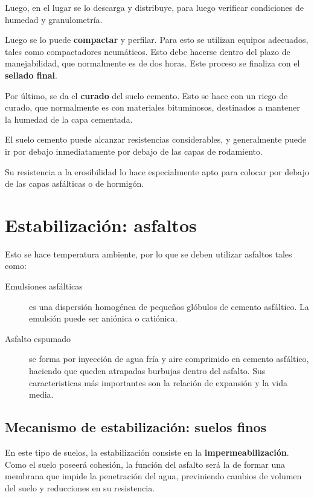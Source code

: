 \documentclass[../main.tex]{subfiles}
\begin{document}
Luego, en el lugar se lo descarga y distribuye, para luego verificar condiciones
de humedad y granulometría.

Luego se lo puede \textbf{compactar} y perfilar. Para esto se utilizan equipos 
adecuados, tales como compactadores neumáticos. Esto debe hacerse dentro del
plazo de manejabilidad, que normalmente es de dos horas. Este proceso se 
finaliza con el \textbf{sellado final}.

Por último, se da el \textbf{curado} del suelo cemento. Esto se hace con un
riego de curado, que normalmente es con materiales bituminosos, destinados a
mantener la humedad de la capa cementada.

El suelo cemento puede alcanzar resistencias considerables, y generalmente puede
ir por debajo inmediatamente por debajo de las capas de rodamiento.

Su resistencia a la erosibilidad lo hace especialmente apto para colocar por 
debajo de las capas asfálticas o de hormigón.

\section{Estabilización: asfaltos}

Esto se hace temperatura ambiente, por lo que se deben utilizar asfaltos tales
como:

\begin{description}
  \item[Emulsiones asfálticas] es una dispersión homogénea de pequeños glóbulos
    de cemento asfáltico. La emulsión puede ser aniónica o catiónica.
  \item[Asfalto espumado] se forma por inyección de agua fría y aire comprimido
    en cemento asfáltico, haciendo que queden atrapadas burbujas dentro del
    asfalto. Sus caracteristicas más importantes son la relación de expansión
    y la vida media.
\end{description}

\subsection{Mecanismo de estabilización: suelos finos}

En este tipo de suelos, la estabilización consiste en la 
\textbf{impermeabilización}. Como el suelo poseerá cohesión, la función del 
asfalto será la de formar una membrana que impide la penetración del agua,
previniendo cambios de volumen del suelo y reducciones en su resistencia.
\end{document}
